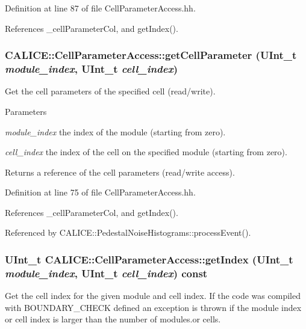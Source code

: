 Definition at line 87 of file CellParameterAccess.hh.

References \_\-cellParameterCol, and getIndex().
\subsubsection[{getCellParameter}]{ CALICE::CellParameterAccess::getCellParameter (UInt\_\-t {\em module\_\-index}, \/  UInt\_\-t {\em cell\_\-index})\hspace{0.3cm}{\ttfamily  [inline]}}\label{classCALICE_1_1CellParameterAccess_a9d73c185b55c36fd2ee903246a5dff7d}


Get the cell parameters of the specified cell (read/write). 
\begin{DoxyParams}{Parameters}
\item[{\em module\_\-index}]the index of the module (starting from zero). \item[{\em cell\_\-index}]the index of the cell on the specified module (starting from zero). \end{DoxyParams}
\begin{DoxyReturn}{Returns}
a reference of the cell parameters (read/write access). 
\end{DoxyReturn}


Definition at line 75 of file CellParameterAccess.hh.

References \_\-cellParameterCol, and getIndex().

Referenced by CALICE::PedestalNoiseHistograms::processEvent().
\subsubsection[{getIndex}]{\setlength{\rightskip}{0pt plus 5cm}UInt\_\-t CALICE::CellParameterAccess::getIndex (UInt\_\-t {\em module\_\-index}, \/  UInt\_\-t {\em cell\_\-index}) const\hspace{0.3cm}{\ttfamily  [inline]}}\label{classCALICE_1_1CellParameterAccess_a7aed10502415d6e9511ad23eace08ece}


Get the cell index for the given module and cell index. If the code was compiled with BOUNDARY\_\-CHECK defined an exception is thrown if the module index or cell index is larger than the number of modules.or cells. 


